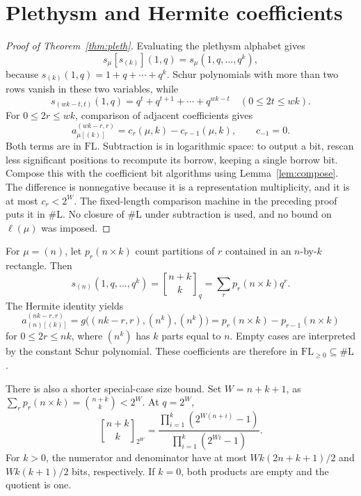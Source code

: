 \documentclass[11pt]{article}
\newcommand{\FL}{\mathrm{FL}}
\newcommand{\FLpos}{\mathrm{FL}_{\geq0}}
\newcommand{\sharpL}{\#\mathrm L}
\newcommand{\len}{\ell}
\begin{document}
\section{Plethysm and Hermite coefficients}
\begin{proof}[Proof of Theorem~\ref{thm:pleth}]
Evaluating the plethysm alphabet gives
\[
s_\mu[s_{(k)}](1,q)=s_\mu(1,q,\ldots,q^k),
\]
because $s_{(k)}(1,q)=1+q+\cdots+q^k$. Schur polynomials with more
than two rows vanish in these two variables, while
\[
s_{(wk-t,t)}(1,q)=q^t+q^{t+1}+\cdots+q^{wk-t}
\quad(0\leq2t\leq wk).
\]
For $0\leq2r\leq wk$, comparison of adjacent coefficients gives
\begin{equation}\label{eq:diff}
a_{\mu[(k)]}^{(wk-r,r)}=c_r(\mu,k)-c_{r-1}(\mu,k),\qquad c_{-1}=0.
\end{equation}
Both terms are in $\FL$. Subtraction is in logarithmic space: to output
a bit, rescan less significant positions to recompute its borrow,
keeping a single borrow bit. Compose this with the coefficient bit
algorithms using Lemma~\ref{lem:compose}. The difference is nonnegative
because it is a representation multiplicity, and it is at most
$c_r<2^W$. The fixed-length comparison machine in the preceding proof
puts it in $\sharpL$. No closure of $\sharpL$ under subtraction is used,
and no bound on $\len(\mu)$ was imposed.
\end{proof}

For $\mu=(n)$, let $p_r(n\times k)$ count partitions of $r$ contained
in an $n$-by-$k$ rectangle. Then
\[
s_{(n)}(1,q,\ldots,q^k)=\genfrac{[}{]}{0pt}{}{n+k}{k}_q
=\sum_rp_r(n\times k)q^r.
\]
The Hermite identity \cite[(6.1)--(6.2)]{GIP} yields
\begin{equation}\label{eq:hermite}
a_{(n)[(k)]}^{(nk-r,r)}
=g\bigl((nk-r,r),(n^k),(n^k)\bigr)
=p_r(n\times k)-p_{r-1}(n\times k)
\end{equation}
for $0\leq2r\leq nk$, where $(n^k)$ has $k$ parts equal to $n$.
Empty cases are interpreted by the constant Schur polynomial. These
coefficients are therefore in $\FLpos\subseteq\sharpL$.

There is also a shorter special-case size bound. Set $W=n+k+1$,
as $\sum_rp_r(n\times k)=\binom{n+k}{k}<2^W$. At $q=2^W$,
\[
\genfrac{[}{]}{0pt}{}{n+k}{k}_{2^W}
=\frac{\prod_{i=1}^k(2^{W(n+i)}-1)}
{\prod_{i=1}^k(2^{Wi}-1)}.
\]
For $k>0$, the numerator and denominator have at most
$Wk(2n+k+1)/2$ and $Wk(k+1)/2$ bits, respectively. If $k=0$,
both products are empty and the quotient is one.
\end{document}

